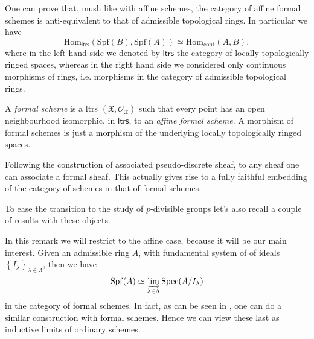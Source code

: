 \documentclass[../Main]{subfiles}
\begin{document}
\begin{rem}[]\label{rem:EquivalenceFormalAffineSchemes}
	One can prove that, mush like with affine schemes, the category of affine
	formal schemes is anti-equivalent to that of admissible topological rings.
	In particular we have
	\begin{equation*}
	\mathrm{Hom}_{\mathsf{ltrs}} \left( \mathrm{Spf}(B), \mathrm{Spf}(A) \right) \simeq
	\mathrm{Hom}_{ \mathrm{cont} } \left( A, B \right)
	,\end{equation*}
	where in the left hand side we denoted by $\mathsf{ltrs}$ the category of
	locally topologically ringed spaces, whereas in the right hand side
	we considered only continuous morphisms of rings, i.e. morphisms
	in the category of admissible topological rings.
\end{rem}


\begin{defn}
	A {\em formal scheme} is a ltrs $( \mathfrak{X} , \mathcal{O}_{ \mathfrak{X} } )$
	such that every point has an open neighbourhood isomorphic,
	in $\mathsf{ltrs}$, to an {\em affine formal scheme}.
	A morphism of formal schemes is just a morphism of the underlying
	locally topologically ringed spaces.
\end{defn}


\begin{rem}[]
	Following the construction of associated pseudo-discrete sheaf,
	to any sheaf one can associate a formal sheaf.
	This actually gives rise to a fully faithful embedding of the category of schemes
	in that of formal schemes.
\end{rem}


To ease the transition to the study of $p$-divisible groups
let's also recall a couple of results with these objects.
\begin{rem}[]
	In this remark we will restrict to the affine case, because it will be
	our main interest.
	Given an admissible ring $A$, with fundamental system of
	of ideals $\left\{ I_\lambda \right\}_{\lambda \in \Lambda}$, then
	we have
	\begin{equation*}
	\mathrm{Spf}(A) \simeq \varinjlim_{\lambda \in \Lambda} \mathrm{Spec}(A/I_\lambda)
	\end{equation*}
	in the category of formal schemes.
	In fact, as can be seen in \cite[\S10.6]{EGA1}, one can do a similar construction
	with formal schemes.
	Hence we can view these last as inductive limits of ordinary schemes.
\end{rem}
\end{document}
